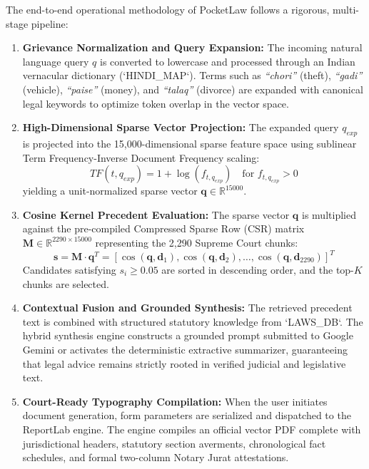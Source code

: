 The end-to-end operational methodology of PocketLaw follows a rigorous, multi-stage pipeline:
\begin{enumerate}
    \item \textbf{Grievance Normalization and Query Expansion:}
    The incoming natural language query $q$ is converted to lowercase and processed through an Indian vernacular dictionary (`HINDI_MAP`). Terms such as \textit{``chori''} (theft), \textit{``gadi''} (vehicle), \textit{``paise''} (money), and \textit{``talaq''} (divorce) are expanded with canonical legal keywords to optimize token overlap in the vector space.
    
    \item \textbf{High-Dimensional Sparse Vector Projection:}
    The expanded query $q_{exp}$ is projected into the 15,000-dimensional sparse feature space using sublinear Term Frequency-Inverse Document Frequency scaling:
    \begin{equation}
        TF(t, q_{exp}) = 1 + \log(f_{t, q_{exp}}) \quad \text{for } f_{t, q_{exp}} > 0
    \end{equation}
    yielding a unit-normalized sparse vector $\mathbf{q} \in \mathbb{R}^{15000}$.
    
    \item \textbf{Cosine Kernel Precedent Evaluation:}
    The sparse vector $\mathbf{q}$ is multiplied against the pre-compiled Compressed Sparse Row (CSR) matrix $\mathbf{M} \in \mathbb{R}^{2290 \times 15000}$ representing the 2,290 Supreme Court chunks:
    \begin{equation}
        \mathbf{s} = \mathbf{M} \cdot \mathbf{q}^T = \left[ \cos(\mathbf{q}, \mathbf{d}_1), \cos(\mathbf{q}, \mathbf{d}_2), \dots, \cos(\mathbf{q}, \mathbf{d}_{2290}) \right]^T
    \end{equation}
    Candidates satisfying $s_i \ge 0.05$ are sorted in descending order, and the top-$K$ chunks are selected.
    
    \item \textbf{Contextual Fusion and Grounded Synthesis:}
    The retrieved precedent text is combined with structured statutory knowledge from `LAWS_DB`. The hybrid synthesis engine constructs a grounded prompt submitted to Google Gemini or activates the deterministic extractive summarizer, guaranteeing that legal advice remains strictly rooted in verified judicial and legislative text.
    
    \item \textbf{Court-Ready Typography Compilation:}
    When the user initiates document generation, form parameters are serialized and dispatched to the ReportLab engine. The engine compiles an official vector PDF complete with jurisdictional headers, statutory section averments, chronological fact schedules, and formal two-column Notary Jurat attestations.
\end{enumerate}
